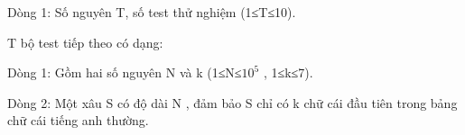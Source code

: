 Dòng 1: Số nguyên T, số test thử nghiệm (1≤T≤10).  

   T bộ test tiếp theo có dạng:  

   Dòng 1: Gồm hai số nguyên N và k (1≤N≤$10^{5}$   , 1≤k≤7).  

   Dòng 2: Một xâu S có độ dài N , đảm bảo S chỉ có k chữ cái đầu tiên trong bảng chữ cái tiếng anh thường.